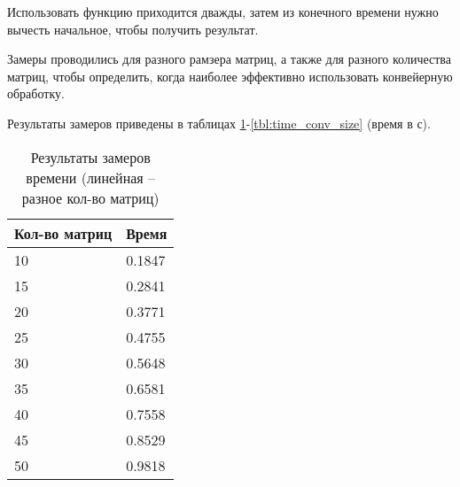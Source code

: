 Использовать функцию приходится дважды, затем из конечного времени нужно вычесть начальное, чтобы получить результат.

Замеры проводились для разного рамзера матриц, а также для разного количества матриц, чтобы определить, когда наиболее эффективно использовать конвейерную обработку.

Результаты замеров приведены в таблицах \ref{tbl:time_lin_count}-\ref{tbl:time_conv_size} (время в с).

\begin{table}[h]
    \begin{center}
        \begin{threeparttable}
        \captionsetup{justification=raggedright,singlelinecheck=off}
        \caption{Результаты замеров времени (линейная -- разное кол-во матриц)}
        \label{tbl:time_lin_count}
        \begin{tabular}{|p{6cm}|p{6cm}|}
            \hline
            Кол-во матриц & Время \\
            \hline
            10 & 0.1847 \\ \hline 
            15 & 0.2841 \\ \hline 
            20 & 0.3771 \\ \hline 
            25 & 0.4755 \\ \hline 
            30 & 0.5648 \\ \hline 
            35 & 0.6581 \\ \hline 
            40 & 0.7558 \\ \hline 
            45 & 0.8529 \\ \hline 
            50 & 0.9818 \\ \hline  
		\end{tabular}
    \end{threeparttable}
\end{center}
\end{table}


